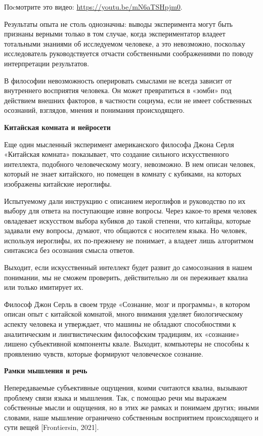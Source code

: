 \begin{fancyquotes}
    Поcмотрите это видео: \url{https://youtu.be/mN6aTSHpjm0}.
\end{fancyquotes}

Результаты опыта не столь однозначны: выводы эксперимента могут быть признаны верными только в том случае, когда экспериментатор владеет тотальными знаниями об исследуемом человеке, а это невозможно, поскольку исследователь руководствуется отчасти собственными соображениями по поводу интерпретации результатов.

В философии невозможность оперировать смыслами не всегда зависит от внутреннего восприятия человека. Он может превратиться в «зомби» под действием внешних факторов, в частности социума, если не имеет собственных осознаний, взглядов, мнения и понимания происходящего.

\textbf{Китайская комната и нейросети}

Еще один мысленный эксперимент американского философа Джона Серля «Китайская комната» показывает, что создание сильного искусственного интеллекта, подобного человеческому мозгу, невозможно. В нем описан человек, который не знает китайского, но помещен в комнату с кубиками, на которых изображены китайские иероглифы.

Испытуемому дали инструкцию с описанием иероглифов и руководство по их выбору для ответа на поступающие извне вопросы. Через какое-то время человек овладевает искусством выбора кубиков до такой степени, что китайцы, которые задавали ему вопросы, думают, что общаются с носителем языка. Но человек, используя иероглифы, их по-прежнему не понимает, а владеет лишь алгоритмом синтаксиса без осознания смысла ответов.

Выходит, если искусственный интеллект будет развит до самосознания в нашем понимании, мы не сможем проверить, действительно ли он переживает квалиа или только имитирует их.

Философ Джон Серль в своем труде «Сознание, мозг и программы», в котором описан опыт с китайской комнатой, много внимания уделяет биологическому аспекту человека и утверждает, что машины не обладают способностями к аналитическим и лингвистическим философским традициям, их «сознание» лишено субъективной компоненты квале. Выходит, компьютеры не способны к проявлению чувств, которые формируют человеческое сознание.

\textbf{Рамки мышления и речь}

Непередаваемые субъективные ощущения, коими считаются квалиа, вызывают проблему связи языка и мышления. Так, с помощью речи мы выражаем собственные мысли и ощущения, но в этих же рамках и понимаем других; иными словами, наше мышление ограничено собственным восприятием происходящего и сути вещей [Frontiersin, 2021].

